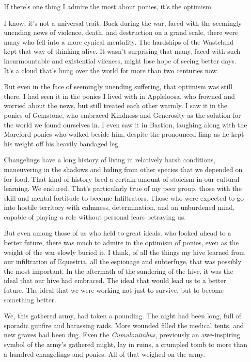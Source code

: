 If there’s one thing I admire the most about ponies, it’s the optimism.

I know, it’s not a universal trait. Back during the war, faced with the seemingly unending news of violence, death, and destruction on a grand scale, there were many who fell into a more cynical mentality. The hardships of the Wasteland kept that way of thinking alive. It wasn’t surprising that many, faced with such insurmountable and existential vileness, might lose hope of seeing better days. It’s a cloud that’s hung over the world for more than two centuries now.

But even in the face of seemingly unending suffering, that optimism was still there. I had seen it in the ponies I lived with in Appleloosa, who frowned and worried about the news, but still treated each other warmly. I saw it in the ponies of Gemstone, who embraced Kindness and Generosity as the solution for the world we found ourselves in. I even saw it in Bastion, laughing along with the Mareford ponies who walked beside him, despite the pronounced limp as he kept his weight off his heavily bandaged leg.

Changelings have a long history of living in relatively harsh conditions, maneuvering in the shadows and hiding from other species that we depended on for food. That kind of history bred a certain amount of stoicism in our cultural learning. We endured. That’s particularly true of my peer group, those with the skill and mental fortitude to become Infiltrators. Those who were expected to go into hostile territory with calmness, determination, and an unburdened mind, capable of playing a role without personal fears betraying us.

But even among those of us who held to great ideals, who looked ahead to a better future, there was much to admire in the optimism of ponies, even as the weight of the war slowly buried it. I think, of all the things my hive learned from our infiltration of Equestria, all the espionage and subterfuge, that was possibly the most important. In the aftermath of the sundering of the hive, it was the ideal that our hive had embraced. The ideal that would lead us to a better future. The ideal that we were working not just to survive, but to become something better.

We, this gathered army, had taken a pounding. The night had been long, full of sporadic gunfire and harassing raids. More wounded filled the medical tents, and new graves had been dug. Even the \textit{Cumulonimbus}, previously an awe-inspiring symbol of the army’s gathered might, lay in ruins, a crumpled tomb to more than a hundred changelings and ponies. All of that weighed on the army.


